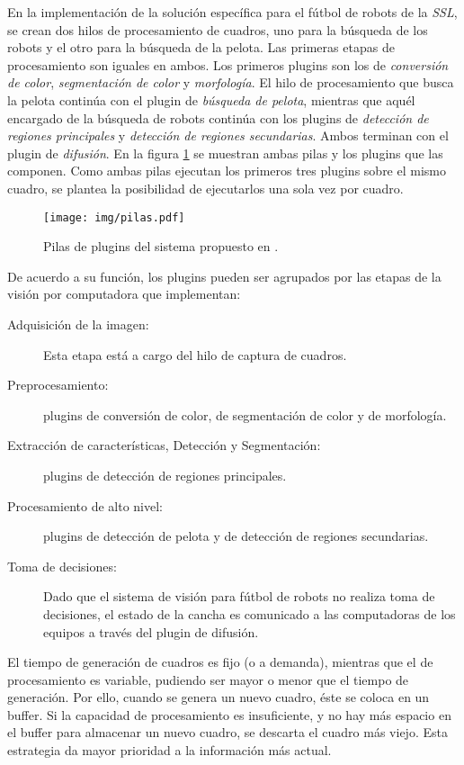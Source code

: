 En la implementación de la solución específica para el fútbol de robots de la
\emph{SSL}, se crean dos hilos de procesamiento de cuadros, uno para la búsqueda
de los robots y el otro para la búsqueda de la pelota. Las primeras etapas de
procesamiento son iguales en ambos. Los primeros plugins son los de
\emph{conversión de color}, \emph{segmentación de color} y \emph{morfología}. El
hilo de procesamiento que busca la pelota continúa con el plugin de
\emph{búsqueda de pelota}, mientras que aquél encargado de la búsqueda de robots
continúa con los plugins de \emph{detección de regiones principales} y
\emph{detección de regiones secundarias}. Ambos terminan con el plugin de
\emph{difusión}. En la figura \ref{pilasPlugins} se muestran ambas pilas y los
plugins que las componen. Como ambas pilas ejecutan los primeros tres plugins
sobre el mismo cuadro, se plantea la posibilidad de ejecutarlos una sola vez por
cuadro.

\begin{figure}[!htb]

	\texttt{[image: img/pilas.pdf]}

	\caption{Pilas de plugins del sistema propuesto en \cite{torres2014}.}

	\label{pilasPlugins}

\end{figure}


De acuerdo a su función, los plugins pueden ser agrupados por las etapas de la
visión por computadora que implementan:

\begin{description}

	\item[Adquisición de la imagen:] Esta etapa está a cargo del hilo de
		captura de cuadros.

	\item[Preprocesamiento:] plugins de conversión de color, de segmentación
		de color y de morfología.

	\item[Extracción de características, Detección y Segmentación:] plugins
		de detección de regiones principales.

	\item[Procesamiento de alto nivel:] plugins de detección de pelota y de
		detección de regiones secundarias.

	\item[Toma de decisiones:] Dado que el sistema de visión para fútbol de
		robots no realiza toma de decisiones, el estado de la cancha es
		comunicado a las computadoras de los equipos a través del plugin
		de difusión.

\end{description}

El tiempo de generación de cuadros es fijo (o a demanda), mientras que el de
procesamiento es variable, pudiendo ser mayor o menor que el tiempo de
generación. Por ello, cuando se genera un nuevo cuadro, éste se coloca en un
buffer. Si la capacidad de procesamiento es insuficiente, y no hay más espacio
en el buffer para almacenar un nuevo cuadro, se descarta el cuadro más viejo.
Esta estrategia da mayor prioridad a la información más actual.

